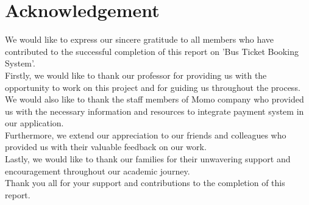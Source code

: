 \section{Acknowledgement}
\noindent We would like to express our sincere gratitude to all members who have contributed to the successful completion of this report on 'Bus Ticket Booking System'.\\
Firstly, we would like to thank our professor for providing us with the opportunity to work on this project and for guiding us throughout the process.\\
We would also like to thank the staff members of Momo company who provided us with the necessary information and resources to integrate payment system in our application.\\
Furthermore, we extend our appreciation to our friends and colleagues who provided us with their valuable feedback on our work.\\
Lastly, we would like to thank our families for their unwavering support and encouragement throughout our academic journey.\\
Thank you all for your support and contributions to the completion of this report.

